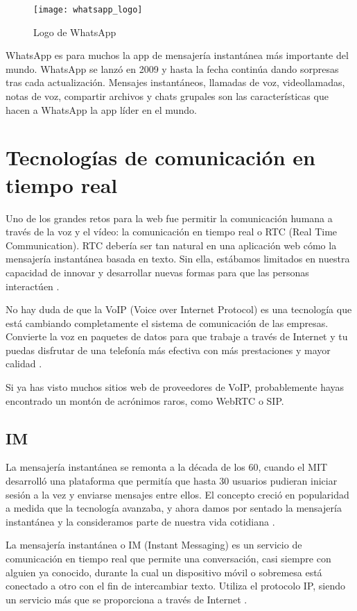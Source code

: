 \begin{figure}[htp!]
  \centering
  \texttt{[image: whatsapp\_logo]}
  \caption{Logo de WhatsApp}
  \label{fig:whatsapp_logo}
\end{figure}

WhatsApp es para muchos la app de mensajería instantánea más importante del mundo. WhatsApp se lanzó en 2009 y hasta la fecha continúa dando sorpresas tras cada actualización. Mensajes instantáneos, llamadas de voz, videollamadas, notas de voz, compartir archivos y chats grupales son las características que hacen a WhatsApp la app líder en el mundo.

\section{Tecnologías de comunicación en tiempo real}

Uno de los grandes retos para la web fue permitir la comunicación humana a través de la voz y el vídeo: la comunicación en tiempo real o RTC (Real Time Communication). RTC debería ser tan natural en una aplicación web cómo la mensajería instantánea basada en texto. Sin ella, estábamos limitados en nuestra capacidad de innovar y desarrollar nuevas formas para que las personas interactúen \cite{webrtc3}.

No hay duda de que la VoIP (Voice over Internet Protocol) es una tecnología que está cambiando completamente el sistema de comunicación de las empresas. Convierte la voz en paquetes de datos para que trabaje a través de Internet y tu puedas disfrutar de una telefonía más efectiva con más prestaciones y mayor calidad \cite{webrtc2}.

Si ya has visto muchos sitios web de proveedores de VoIP, probablemente hayas encontrado un montón de acrónimos raros, como WebRTC o SIP.

\subsection{IM}

La mensajería instantánea se remonta a la década de los 60, cuando el MIT desarrolló una plataforma que permitía que hasta 30 usuarios pudieran iniciar sesión a la vez y enviarse mensajes entre ellos. El concepto creció en popularidad a medida que la tecnología avanzaba, y ahora damos por sentado la mensajería instantánea y la consideramos parte de nuestra vida cotidiana \cite{im1}.

La mensajería instantánea o IM (Instant Messaging) es un servicio de comunicación en tiempo real que permite una conversación, casi siempre con alguien ya conocido, durante la cual un dispositivo móvil o sobremesa está conectado a otro con el fin de intercambiar texto. Utiliza el protocolo IP, siendo un servicio más que se proporciona a través de Internet \cite{im7}.

